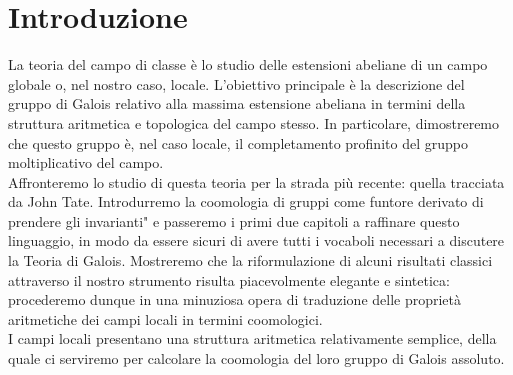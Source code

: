 \chapter*{Introduzione}

La teoria del campo di classe è lo studio delle estensioni abeliane di un campo globale o, nel nostro caso, locale. L'obiettivo principale è la descrizione del gruppo di Galois relativo alla massima estensione abeliana in termini della struttura aritmetica e topologica del campo stesso. In particolare, dimostreremo che questo gruppo è, nel caso locale, il completamento profinito del gruppo moltiplicativo del campo. \\

Affronteremo lo studio di questa teoria per la strada più recente: quella tracciata da John Tate. Introdurremo la coomologia di gruppi come funtore derivato di \leftquote prendere gli invarianti" e passeremo i primi due capitoli a raffinare questo linguaggio, in modo da essere sicuri di avere tutti i vocaboli necessari a discutere la Teoria di Galois. Mostreremo che la riformulazione di alcuni risultati classici attraverso il nostro strumento risulta piacevolmente elegante e sintetica: procederemo dunque in una minuziosa opera di traduzione delle proprietà aritmetiche dei campi locali in termini coomologici. \\

I campi locali presentano una struttura aritmetica relativamente semplice, della quale ci serviremo per calcolare la coomologia del loro gruppo di Galois assoluto. 





\vfill\break
